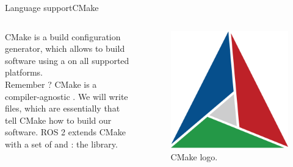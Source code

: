 \begin{frame}{Language support}{CMake}
  \begin{columns}
    CMake is a  build configuration generator, which allows to build software using a  on all supported platforms.\\
    Remember ? CMake is a compiler-agnostic .
    \newline\newline
    We will write  files, which are essentially  that tell CMake how to build our software.
    \newline\newline
    ROS 2 extends CMake with a set of  and : the \href{https://docs.ros.org/en/humble/How-To-Guides/Ament-CMake-Documentation.html}{} library.

    \begin{figure}
      \centering
      \includegraphics[width=.7\textwidth]{cmake}
      \caption{CMake logo.}
      \label{fig:cmake}
    \end{figure}
  \end{columns}
\end{frame}
